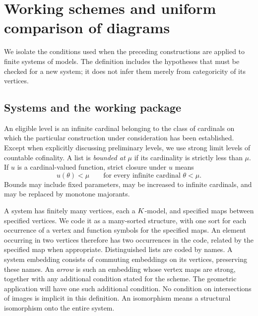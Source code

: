 \section{Working schemes and uniform comparison of diagrams}
\label{lev:section-working-schemes}

We isolate the conditions used when the preceding constructions are applied
to finite systems of models.  The definition includes the hypotheses that
must be checked for a new system; it does not infer them merely from
categoricity of its vertices.

\subsection{Systems and the working package}

\begin{convention}
\label{lev:level-convention}
An eligible level is an infinite cardinal belonging to the class of
cardinals on which the particular construction under consideration has
been established.  Except when explicitly discussing preliminary levels,
we use strong limit levels of countable cofinality.  A list is
\emph{bounded at $\mu$} if its cardinality is strictly less than $\mu$.
If $u$ is a cardinal-valued function, strict closure under $u$ means
\[
  u(\theta)<\mu
  \qquad\text{for every infinite cardinal }\theta<\mu.
\]
Bounds may include fixed parameters, may be increased to infinite
cardinals, and may be replaced by monotone majorants.
\end{convention}

A system has finitely many vertices, each a $K$-model, and specified
maps between specified vertices.  We code it as a many-sorted structure,
with one sort for each occurrence of a vertex and function symbols for
the specified maps.  An element occurring in two vertices therefore
has two occurrences in the code, related by the specified map when
appropriate.  Distinguished lists are coded by names.  A system
embedding consists of commuting embeddings on its vertices, preserving
these names.  An \emph{arrow} is such an embedding whose vertex maps are
strong, together with any additional condition stated for the scheme.
The geometric application will have one such additional condition.
No condition on intersections of images is implicit in this definition.
An isomorphism means a structural isomorphism onto the entire system.

